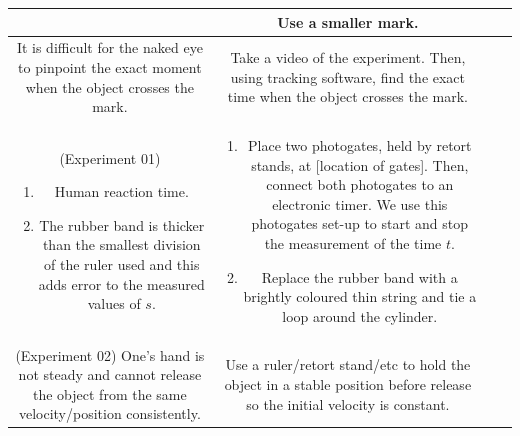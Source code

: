 \documentclass[oneside]{book}
\begin{document}
\begin{itemize}
\begin{longtable}{|Sc|Sc|}
\begin{minipage}{0.5\textwidth-25.2pt}
        \end{minipage}&
        Use a smaller mark.\\
        \hline
        \begin{minipage}{0.5\textwidth-25.2pt}
            It is difficult for the naked eye to pinpoint the exact moment when the object crosses the mark. 
        \end{minipage}&
        \begin{minipage}{0.5\textwidth-25.2pt}
            Take a video of the experiment. Then, using tracking software, find the exact time when the object crosses the mark. 
        \end{minipage}\\
        \hline
        \begin{minipage}{0.5\textwidth-25.2pt}
            (Experiment 01)
            \begin{enumerate}
                \item Human reaction time.
                \item The rubber band is thicker than the smallest division of the ruler used and this adds error to the measured values of \(s\).
            \end{enumerate}
        \end{minipage}& 
        \begin{minipage}{0.5\textwidth-25.2pt}
            \begin{enumerate}
                \item Place two photogates, held by retort stands, at [location of gates]. Then, connect both photogates to an electronic timer. We use this photogates set-up to start and stop the measurement of the time \(t\).
                \item Replace the rubber band with a brightly coloured thin string and tie a loop around the cylinder.
            \end{enumerate}
        \end{minipage}\\
        \hline
        \begin{minipage}{0.5\textwidth-25.2pt}
            (Experiment 02) One's hand is not steady and cannot release the object from the same velocity/position consistently.
        \end{minipage}& 
        \begin{minipage}{0.5\textwidth-25.2pt}
            Use a ruler/retort stand/etc to hold the object in a stable position before release so the initial velocity is constant.

\end{minipage}
\end{longtable}
\end{itemize}
\end{document}
